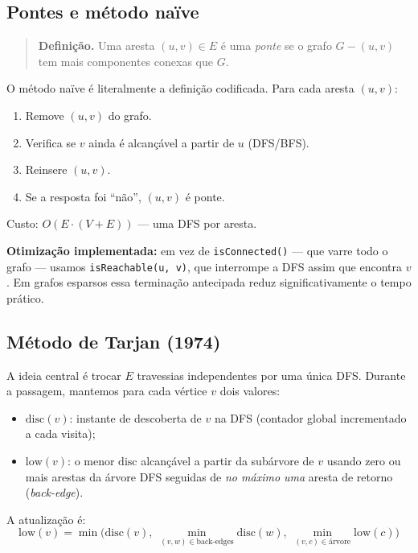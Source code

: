 \documentclass[12pt]{article}
\begin{document}
\subsection{Pontes e método naïve}

\begin{quote}
\textbf{Definição.} Uma aresta $(u,v) \in E$ é uma \textit{ponte} se o
grafo $G - (u,v)$ tem mais componentes conexas que $G$.
\end{quote}

O método naïve é literalmente a definição codificada. Para cada aresta
$(u,v)$:
\begin{enumerate}
    \item Remove $(u,v)$ do grafo.
    \item Verifica se $v$ ainda é alcançável a partir de $u$ (DFS/BFS).
    \item Reinsere $(u,v)$.
    \item Se a resposta foi ``não'', $(u,v)$ é ponte.
\end{enumerate}

Custo: $O(E \cdot (V{+}E))$ --- uma DFS por aresta.

\textbf{Otimização implementada:} em vez de \texttt{isConnected()} ---
que varre todo o grafo --- usamos \texttt{isReachable(u,\,v)}, que
interrompe a DFS assim que encontra $v$. Em grafos esparsos essa terminação
antecipada reduz significativamente o tempo prático.

\subsection{Método de Tarjan (1974)}
\label{sec:tarjan}

A ideia central é trocar $E$ travessias independentes por uma única DFS.
Durante a passagem, mantemos para cada vértice $v$ dois valores:
\begin{itemize}
    \item $\mathrm{disc}(v)$: instante de descoberta de $v$ na DFS
          (contador global incrementado a cada visita);
    \item $\mathrm{low}(v)$: o menor $\mathrm{disc}$ alcançável a partir
          da subárvore de $v$ usando zero ou mais arestas da árvore DFS
          seguidas de \emph{no máximo uma} aresta de retorno
          (\textit{back-edge}).
\end{itemize}

A atualização é:
\[
\mathrm{low}(v) = \min\!\Big(\mathrm{disc}(v),\;
    \min_{(v,w) \in \text{back-edges}} \!\mathrm{disc}(w),\;
    \min_{(v,c) \in \text{árvore}} \!\mathrm{low}(c)\Big)
\]
\end{document}
